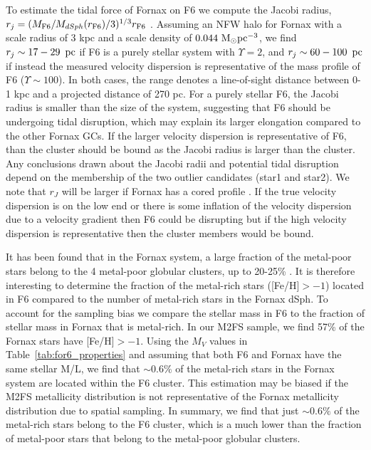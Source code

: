\documentclass[twocolumn]{aastex63}
\begin{document}
To estimate the tidal force of  Fornax  on F6 we compute the Jacobi radius, $r_j = (M_{\rm F6}/M_{dSph}(r_{\rm F6})/3)^{1/3} r_{\rm F6}$ \citep{BT2008}.
Assuming an NFW halo for  Fornax  with a scale radius of 3 kpc and a scale density of  $0.044 \, \mathrm{\,M_\odot} {\rm pc^{-3}}$, we find $r_j\sim17-29~\mathrm{\,pc}$ if F6 is a purely stellar system with $\Upsilon=2$, and $r_j\sim60-100~\mathrm{\,pc}$ if instead the measured velocity dispersion is representative of the mass profile of F6 ($\Upsilon \sim 100$).  In both cases, the range denotes a line-of-sight distance between 0-1 kpc and a projected distance of 270 pc. 
For a purely stellar F6, the Jacobi radius is smaller than the size of the system, suggesting that F6 should be undergoing tidal disruption, which may explain its larger elongation compared to the other Fornax GCs. 
If the larger velocity dispersion is representative of F6, than the cluster should be bound as the Jacobi radius is larger than the cluster. 
Any conclusions drawn about the Jacobi radii and potential tidal disruption depend on the membership of the two outlier candidates (star1 and star2). 
We note that $r_J$ will be larger if Fornax has a cored profile \citep{Wang2019ApJ...875L..13W}.
If the true velocity dispersion is on the low end or there is some inflation of the velocity dispersion due to a velocity gradient then F6 could be disrupting but if the high velocity dispersion is representative then the cluster members would be bound. 




It has been found that in the Fornax system, a large fraction of the metal-poor stars belong to the 4 metal-poor globular clusters, up to 20-25\% \citep{Larsen2012A&A...544L..14L}.
It is therefore interesting to determine the fraction of the metal-rich stars ([Fe/H]$>-1$) located in F6 compared to the number of metal-rich stars in the Fornax dSph. 
To account for the sampling bias we compare the stellar mass in F6 to the fraction of  stellar mass in Fornax that is metal-rich. In our M2FS sample, we find 57\% of the Fornax stars have [Fe/H]$>-1$. Using  the $M_V$ values in Table~\ref{tab:for6_properties} and assuming that both F6 and Fornax have the same stellar M/L, we find that $\sim0.6\%$ of the metal-rich stars in the Fornax system are located within the F6 cluster.  
This estimation may  be biased if the  M2FS metallicity distribution is not  representative of the Fornax  metallicity distribution due to spatial sampling.
In summary, we find that just $\sim0.6\%$ of the metal-rich stars belong to the F6 cluster, which  is a much lower than the fraction of metal-poor stars that belong to the metal-poor globular clusters.  
\end{document}
